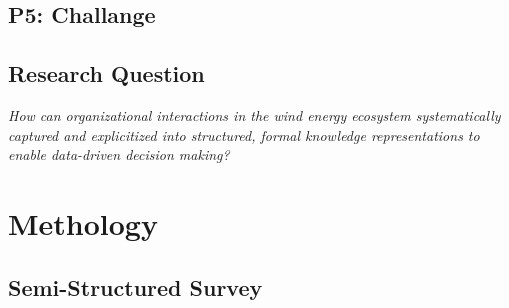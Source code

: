 \documentclass[runningheads]{llncs}
\begin{document}
\subsection{P5: Challange }

\subsection*{\textbf{Research Question}}
\begin{center}
    \textit{How can organizational interactions in the wind energy ecosystem 
systematically captured and explicitized into structured, formal knowledge representations to enable data-driven decision making?}
\end{center}

\section{Methology}

\subsection{Semi-Structured Survey}
\end{document}
